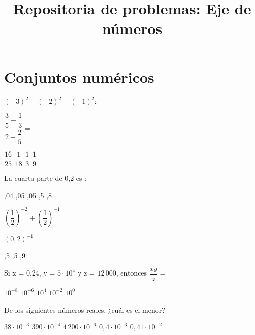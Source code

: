 \documentclass[pagina vacia]{srs}
\title{Repositoria de problemas: Eje de números}
\begin{document}
\maketitle
\section{Conjuntos numéricos}

\begin{preguntas}[after-item-skip=1cm]
\pregunta \( \left(-3\right)^2 - \left(-2\right)^2 - \left(-1\right)^2 : \)
\begin{vertical}
\end{vertical}

\pregunta \( \dfrac{\dfrac{3}{5} - \dfrac{1}{3}}{2 + \dfrac{2}{5}} = \)
\begin{vertical}
\alternativa \( \dfrac{16}{25} \)
\alternativa \( \dfrac{1}{18} \)
\alternativa \( \dfrac{1}{3} \)
\alternativa \( \dfrac{1}{9} \)
\end{vertical}

\pregunta La cuarta parte de 0,2 es :
\begin{vertical}
,04
,05
,05
,5
,8
\end{vertical}

\pregunta \( \left(\dfrac{1}{2}\right)^{-2} + \left(\dfrac{1}{2}\right)^{-1} = \)
\begin{vertical}
\end{vertical}

\pregunta \( (0,2)^{-1} = \)
\begin{vertical}
,5
,5
,9
\end{vertical}

\pregunta Si x = 0,24, y = \(5 \cdot 10^4\) y z = \(12\,000\), entonces \( \dfrac{xy}{z} = \)
\begin{vertical}
\alternativa \( 10^{-8} \)
\alternativa \( 10^{-6} \)
\alternativa \( 10^{4} \)
\alternativa \( 10^{-2} \)
\alternativa \( 10^{0} \)
\end{vertical}

\pregunta De los siguientes números reales, ¿cuál es el menor?
\begin{vertical}
\alternativa \( 38 \cdot 10^{-3} \)
\alternativa \( 390 \cdot 10^{-4} \)
\alternativa \( 4\,200 \cdot 10^{-6} \)
\alternativa \( 0,4 \cdot 10^{-3} \)
\alternativa \( 0,41 \cdot 10^{-2} \)
\end{vertical}


\end{preguntas}
\end{document}
